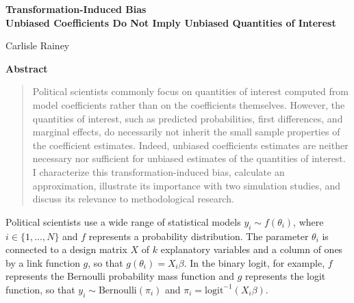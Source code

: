 \documentclass[12pt]{article}
\begin{document}
\begin{center}
{\LARGE \textbf{Transformation-Induced Bias}}\\\vspace{2mm}
{ \textbf{Unbiased Coefficients Do Not Imply Unbiased Quantities of Interest}}

\vspace{5mm}

Carlisle Rainey
\end{center}

\vspace{5mm}

{\centerline{\textbf{Abstract}}}
\begin{quote}\noindent
Political scientists commonly focus on quantities of interest computed from model coefficients rather than on the coefficients themselves. 
However, the quantities of interest, such as predicted probabilities, first differences, and marginal effects, do necessarily not inherit the small sample properties of the coefficient estimates. 
Indeed, unbiased coefficients estimates are neither necessary nor sufficient for unbiased estimates of the quantities of interest. 
I characterize this transformation-induced bias, calculate an approximation, illustrate its importance with two simulation studies, and discuss its relevance to methodological research.
 \end{quote}



\thispagestyle{empty}

\doublespace


Political scientists use a wide range of statistical models $y_i \sim f(\theta_i)$, where $i \in \{1,..., N\}$ and $f$ represents a probability distribution. 
The parameter $\theta_i$ is connected to a design matrix $X$ of $k$ explanatory variables and a column of ones by a link function $g$, so that $g(\theta_i) = X_i\beta$. 
In the binary logit, for example, $f$ represents the Bernoulli probability mass function and $g$ represents the logit function, so that $y_i \sim \text{Bernoulli}(\pi_i)$ and $\pi_i = \text{logit}^{-1}(X_i\beta)$.
\end{document}
